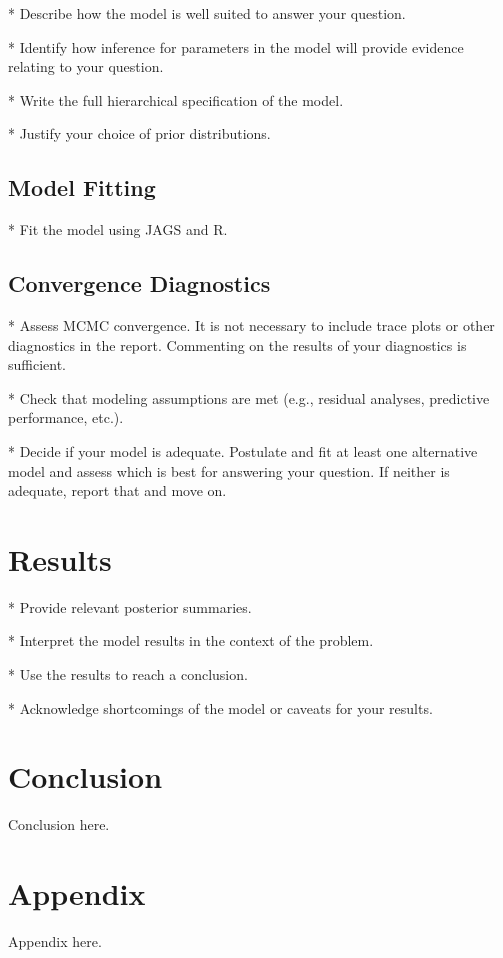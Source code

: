 \documentclass[journal, a4paper]{IEEEtran}
\begin{document}
* Describe how the model is well suited to answer your question.

* Identify how inference for parameters in the model will provide evidence relating to your question.

* Write the full hierarchical specification of the model.

* Justify your choice of prior distributions.

\subsection{Model Fitting}

* Fit the model using JAGS and R.

\subsection{Convergence Diagnostics}

* Assess MCMC convergence. It is not necessary to include trace plots or other diagnostics in the report. Commenting on the results of your diagnostics is sufficient.

* Check that modeling assumptions are met (e.g., residual analyses, predictive performance, etc.).

* Decide if your model is adequate. Postulate and fit at least one alternative model and assess which is best for answering your question. If neither is adequate, report that and move on.

\section{Results}

* Provide relevant posterior summaries.

* Interpret the model results in the context of the problem.

* Use the results to reach a conclusion.

* Acknowledge shortcomings of the model or caveats for your results.

\section{Conclusion}

Conclusion here.

\newpage
\onecolumn

\section{Appendix}

Appendix here.
\end{document}
